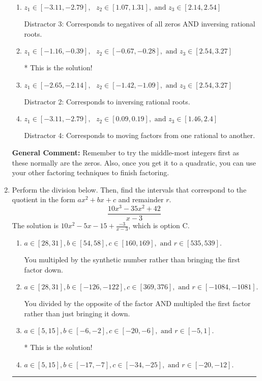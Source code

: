 \documentclass{extbook}[14pt]
\newcommand{\litem}[1]{\item #1

\rule{\textwidth}{0.4pt}}
\begin{document}
\begin{enumerate}
{\begin{enumerate}[label=\Alph*.]
 Distractor 1: Corresponds to negatives of all zeros.
\item \( z_1 \in [-3.11, -2.79], \text{   }  z_2 \in [1.07, 1.31], \text{   and   } z_3 \in [2.14, 2.54] \)

 Distractor 3: Corresponds to negatives of all zeros AND inversing rational roots.
\item \( z_1 \in [-1.16, -0.39], \text{   }  z_2 \in [-0.67, -0.28], \text{   and   } z_3 \in [2.54, 3.27] \)

* This is the solution!
\item \( z_1 \in [-2.65, -2.14], \text{   }  z_2 \in [-1.42, -1.09], \text{   and   } z_3 \in [2.54, 3.27] \)

 Distractor 2: Corresponds to inversing rational roots.
\item \( z_1 \in [-3.11, -2.79], \text{   }  z_2 \in [0.09, 0.19], \text{   and   } z_3 \in [1.46, 2.4] \)

 Distractor 4: Corresponds to moving factors from one rational to another.
\end{enumerate}

\textbf{General Comment:} Remember to try the middle-most integers first as these normally are the zeros. Also, once you get it to a quadratic, you can use your other factoring techniques to finish factoring.
}
\litem{
Perform the division below. Then, find the intervals that correspond to the quotient in the form $ax^2+bx+c$ and remainder $r$.
\[ \frac{10x^{3} -35 x^{2} + 42}{x -3} \]The solution is \( 10x^{2} -5 x -15 + \frac{-3}{x -3} \), which is option C.\begin{enumerate}[label=\Alph*.]
\item \( a \in [28, 31], b \in [54, 58], c \in [160, 169], \text{ and } r \in [535, 539]. \)

 You multipled by the synthetic number rather than bringing the first factor down.
\item \( a \in [28, 31], b \in [-126, -122], c \in [369, 376], \text{ and } r \in [-1084, -1081]. \)

 You divided by the opposite of the factor AND multipled the first factor rather than just bringing it down.
\item \( a \in [5, 15], b \in [-6, -2], c \in [-20, -6], \text{ and } r \in [-5, 1]. \)

* This is the solution!
\item \( a \in [5, 15], b \in [-17, -7], c \in [-34, -25], \text{ and } r \in [-20, -12]. \)


\end{enumerate}}
\end{enumerate}
\end{document}
